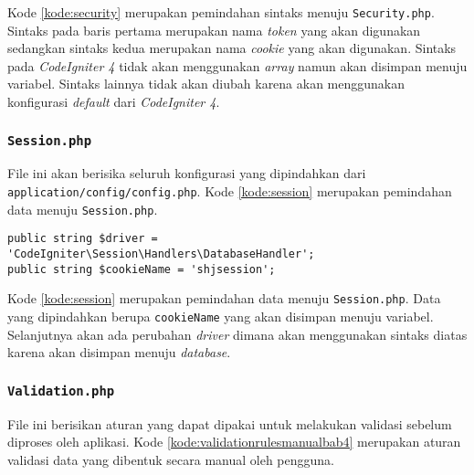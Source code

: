 Kode \ref{kode:security} merupakan pemindahan sintaks menuju \texttt{Security.php}. Sintaks pada baris pertama merupakan nama \textit{token} yang akan digunakan sedangkan sintaks kedua merupakan nama \textit{cookie} yang akan digunakan. Sintaks pada \textit{CodeIgniter 4} tidak akan menggunakan \textit{array} namun akan disimpan menuju variabel. Sintaks lainnya tidak akan diubah karena akan menggunakan konfigurasi \textit{default} dari \textit{CodeIgniter 4}.

\subsubsection{\texttt{Session.php}}
File ini akan berisika seluruh konfigurasi yang dipindahkan dari \texttt{application/config/config.php}. Kode \ref{kode:session} merupakan pemindahan data menuju \texttt{Session.php}.
\begin{lstlisting}[caption=Pemindahan file \textit{config} menuju \textit{Session}, label=kode:session]
public string $driver = 'CodeIgniter\Session\Handlers\DatabaseHandler';
public string $cookieName = 'shjsession';
\end{lstlisting}

Kode \ref{kode:session} merupakan pemindahan data menuju \texttt{Session.php}. Data yang dipindahkan berupa \texttt{cookieName} yang akan disimpan menuju variabel. Selanjutnya akan ada perubahan \textit{driver} dimana akan menggunakan sintaks diatas karena akan disimpan menuju \textit{database}.

\subsubsection{\texttt{Validation.php}}
\label{subsubsec:validationbab4}
File ini berisikan aturan yang dapat dipakai untuk melakukan validasi sebelum diproses oleh aplikasi. Kode \ref{kode:validationrulesmanualbab4} merupakan aturan validasi data yang dibentuk secara manual oleh pengguna.

